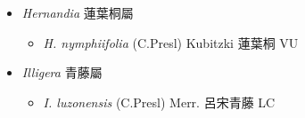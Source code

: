 
  \begin{itemize}
 \item[] \textit{Hernandia} 蓮葉桐屬
                                
  \begin{itemize}
        \item[] \textit{H. nymphiifolia} (C.Presl) Kubitzki  蓮葉桐   VU
  \end{itemize}
 \item[] \textit{Illigera} 青藤屬
                                
  \begin{itemize}
        \item[] \textit{I. luzonensis} (C.Presl) Merr.  呂宋青藤   LC
  \end{itemize}
  \end{itemize}
